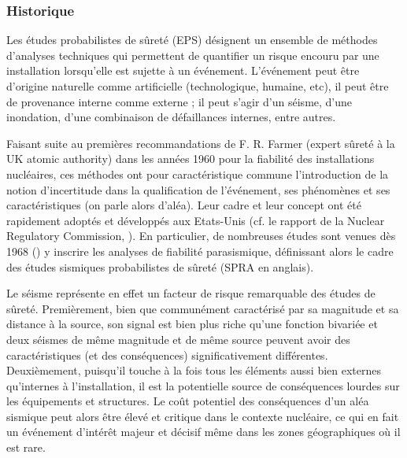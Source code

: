 \subsubsection{Historique}

Les études probabilistes de sûreté (EPS) désignent un ensemble de méthodes d'analyses techniques qui permettent de quantifier un risque encouru par une installation lorsqu'elle est sujette à un événement. L'événement peut être d'origine naturelle comme artificielle (technologique, humaine, etc), il peut être de provenance interne comme externe ; il peut s'agir d'un séisme, d'une inondation, d'une combinaison de défaillances internes, entre autres.  %

Faisant suite au premières recommandations de F. R. Farmer (expert sûreté à la UK atomic authority) dans les années 1960 pour la fiabilité des installations nucléaires,
ces méthodes ont pour caractéristique commune l'introduction de la notion d'incertitude dans la qualification de l'événement, ses phénomènes et ses caractéristiques (on parle alors d'aléa).
%
%
Leur cadre et leur concept ont été rapidement adoptés et développés aux Etats-Unis (cf. le rapport de la Nuclear Regulatory Commission, \cite{nrc_pra_1983}). En particulier, de nombreuses études sont venues dès 1968 (\cite{cornell_engineering_1968}) 
y inscrire les analyses de fiabilité parasismique, définissant alors le cadre des études sismiques probabilistes de sûreté (SPRA en anglais). %



Le séisme représente en effet un facteur de risque remarquable des études de sûreté.
Premièrement, bien que communément caractérisé par sa magnitude et sa distance à la source, son signal est bien plus riche qu'une fonction bivariée et deux séismes de même magnitude et de même source peuvent avoir des caractéristiques (et des conséquences) significativement différentes.
Deuxièmement, puisqu'il touche à la fois tous les éléments aussi bien externes qu'internes à l'installation, il est la potentielle source de conséquences lourdes sur les équipements et structures.
Le coût potentiel des conséquences d'un aléa sismique peut alors être élevé et critique dans le contexte nucléaire, ce qui en fait un événement d'intérêt majeur et décisif même dans les zones géographiques où il est rare.


